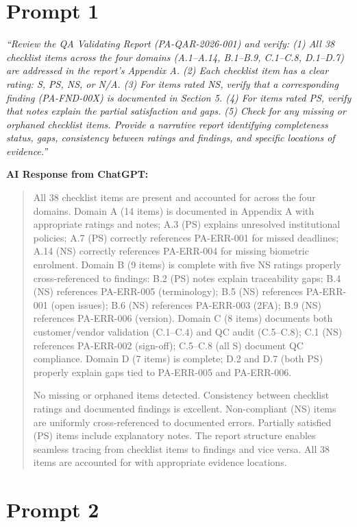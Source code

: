 \documentclass[11pt,a4paper]{article}
\begin{document}
\section*{Prompt 1}

\textit{``Review the QA Validating Report (PA-QAR-2026-001) and verify: (1) All 38 checklist items across the four domains (A.1--A.14, B.1--B.9, C.1--C.8, D.1--D.7) are addressed in the report's Appendix A. (2) Each checklist item has a clear rating: S, PS, NS, or N/A. (3) For items rated NS, verify that a corresponding finding (PA-FND-00X) is documented in Section 5. (4) For items rated PS, verify that notes explain the partial satisfaction and gaps. (5) Check for any missing or orphaned checklist items. Provide a narrative report identifying completeness status, gaps, consistency between ratings and findings, and specific locations of evidence.''}

\textbf{AI Response from ChatGPT:}

\begin{quote}
All 38 checklist items are present and accounted for across the four domains. Domain A (14 items) is documented in Appendix A with appropriate ratings and notes; A.3 (PS) explains unresolved institutional policies; A.7 (PS) correctly references PA-ERR-001 for missed deadlines; A.14 (NS) correctly references PA-ERR-004 for missing biometric enrolment. Domain B (9 items) is complete with five NS ratings properly cross-referenced to findings: B.2 (PS) notes explain traceability gaps; B.4 (NS) references PA-ERR-005 (terminology); B.5 (NS) references PA-ERR-001 (open issues); B.6 (NS) references PA-ERR-003 (2FA); B.9 (NS) references PA-ERR-006 (version). Domain C (8 items) documents both customer/vendor validation (C.1--C.4) and QC audit (C.5--C.8); C.1 (NS) references PA-ERR-002 (sign-off); C.5--C.8 (all S) document QC compliance. Domain D (7 items) is complete; D.2 and D.7 (both PS) properly explain gaps tied to PA-ERR-005 and PA-ERR-006.

No missing or orphaned items detected. Consistency between checklist ratings and documented findings is excellent. Non-compliant (NS) items are uniformly cross-referenced to documented errors. Partially satisfied (PS) items include explanatory notes. The report structure enables seamless tracing from checklist items to findings and vice versa. All 38 items are accounted for with appropriate evidence locations.
\end{quote}

\newpage

\section*{Prompt 2}
\end{document}
